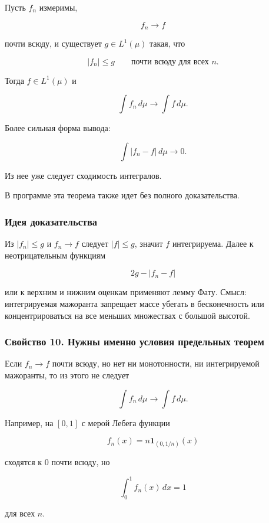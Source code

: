 \documentclass[
  11pt,
  a4paper,
]{article}
\begin{document}
Пусть \(f_n\) измеримы,

\[
f_n\to f
\]

почти всюду, и существует \(g\in L^1(\mu)\) такая, что

\[
|f_n|\le g
\qquad \text{почти всюду для всех }n.
\]

Тогда \(f\in L^1(\mu)\) и

\[
\int f_n\,d\mu\to\int f\,d\mu.
\]

Более сильная форма вывода:

\[
\int |f_n-f|\,d\mu\to0.
\]

Из нее уже следует сходимость интегралов.

В программе эта теорема также идет без полного доказательства.

\subsubsection{Идея
доказательства}\label{ux438ux434ux435ux44f-ux434ux43eux43aux430ux437ux430ux442ux435ux43bux44cux441ux442ux432ux430-1}

Из \(|f_n|\le g\) и \(f_n\to f\) следует \(|f|\le g\), значит \(f\)
интегрируема. Далее к неотрицательным функциям

\[
2g-|f_n-f|
\]

или к верхним и нижним оценкам применяют лемму Фату. Смысл:
интегрируемая мажоранта запрещает массе убегать в бесконечность или
концентрироваться на все меньших множествах с большой высотой.

\subsubsection{Свойство 10. Нужны именно условия предельных
теорем}\label{ux441ux432ux43eux439ux441ux442ux432ux43e-10.-ux43dux443ux436ux43dux44b-ux438ux43cux435ux43dux43dux43e-ux443ux441ux43bux43eux432ux438ux44f-ux43fux440ux435ux434ux435ux43bux44cux43dux44bux445-ux442ux435ux43eux440ux435ux43c}

Если \(f_n\to f\) почти всюду, но нет ни монотонности, ни интегрируемой
мажоранты, то из этого не следует

\[
\int f_n\,d\mu\to\int f\,d\mu.
\]

Например, на \([0,1]\) с мерой Лебега функции

\[
f_n(x)=n\mathbf 1_{(0,1/n)}(x)
\]

сходятся к \(0\) почти всюду, но

\[
\int_0^1 f_n(x)\,dx=1
\]

для всех \(n\).
\end{document}
